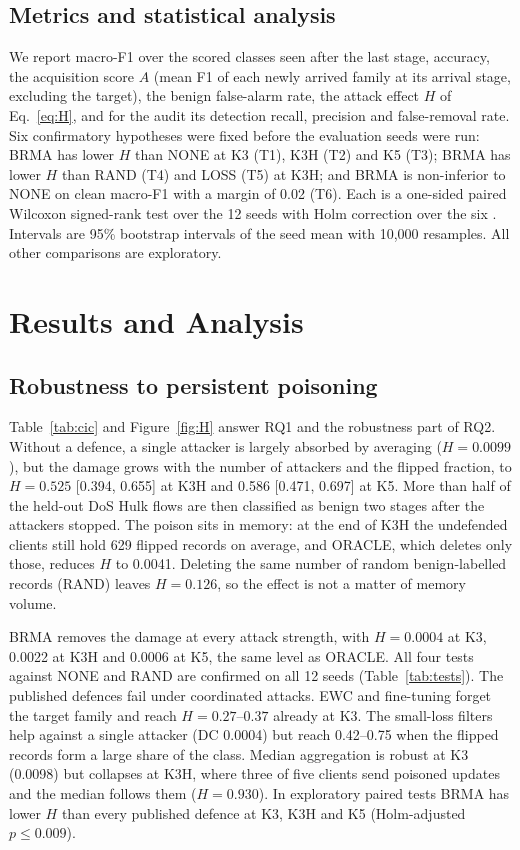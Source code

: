 \documentclass[pdflatex,sn-mathphys-num]{sn-jnl}
\theoremstyle{thmstyleone}
\theoremstyle{thmstylethree}
\begin{document}
\subsection{Metrics and statistical analysis}
We report macro-F1 over the scored classes seen after the last stage, accuracy, the acquisition score $A$ (mean F1 of each newly arrived family at its arrival stage, excluding the target), the benign false-alarm rate, the attack effect $H$ of Eq.~\eqref{eq:H}, and for the audit its detection recall, precision and false-removal rate. Six confirmatory hypotheses were fixed before the evaluation seeds were run: BRMA has lower $H$ than NONE at K3 (T1), K3H (T2) and K5 (T3); BRMA has lower $H$ than RAND (T4) and LOSS (T5) at K3H; and BRMA is non-inferior to NONE on clean macro-F1 with a margin of 0.02 (T6). Each is a one-sided paired Wilcoxon signed-rank test over the 12 seeds \cite{wilcoxon} with Holm correction over the six \cite{holm}. Intervals are 95\% bootstrap intervals of the seed mean with 10{,}000 resamples. All other comparisons are exploratory.

\section{Results and Analysis}\label{sec:results}
\subsection{Robustness to persistent poisoning}
Table~\ref{tab:cic} and Figure~\ref{fig:H} answer RQ1 and the robustness part of RQ2. Without a defence, a single attacker is largely absorbed by averaging ($H=0.0099$), but the damage grows with the number of attackers and the flipped fraction, to $H=0.525$ [0.394, 0.655] at K3H and 0.586 [0.471, 0.697] at K5. More than half of the held-out DoS Hulk flows are then classified as benign two stages after the attackers stopped. The poison sits in memory: at the end of K3H the undefended clients still hold 629 flipped records on average, and ORACLE, which deletes only those, reduces $H$ to 0.0041. Deleting the same number of random benign-labelled records (RAND) leaves $H=0.126$, so the effect is not a matter of memory volume.

BRMA removes the damage at every attack strength, with $H=0.0004$ at K3, 0.0022 at K3H and 0.0006 at K5, the same level as ORACLE. All four tests against NONE and RAND are confirmed on all 12 seeds (Table~\ref{tab:tests}). The published defences fail under coordinated attacks. EWC and fine-tuning forget the target family and reach $H=0.27$--$0.37$ already at K3. The small-loss filters help against a single attacker (DC 0.0004) but reach 0.42--0.75 when the flipped records form a large share of the class. Median aggregation is robust at K3 (0.0098) but collapses at K3H, where three of five clients send poisoned updates and the median follows them ($H=0.930$). In exploratory paired tests BRMA has lower $H$ than every published defence at K3, K3H and K5 (Holm-adjusted $p\le0.009$).
\end{document}
